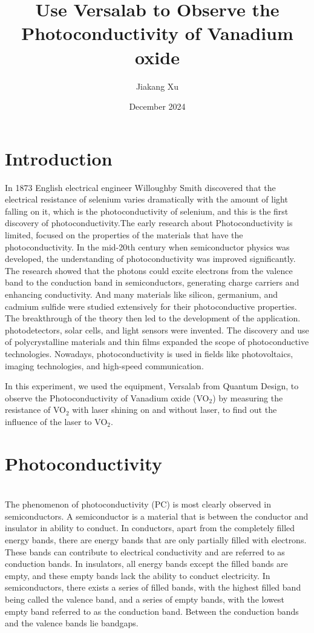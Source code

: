 \documentclass{article}
\title{\vspace{-2.5cm}Use Versalab to Observe the Photoconductivity of Vanadium oxide}
\author{Jiakang Xu}
\date{December 2024}
\begin{document}
\maketitle




\section{Introduction}
In 1873 English electrical engineer Willoughby Smith discovered that the electrical resistance of selenium varies dramatically with the amount of light falling on it, which is the photoconductivity of selenium, and this is the first discovery of photoconductivity\parencite{Smith73}.The early research about Photoconductivity is limited, focused on the properties of the materials that have the photoconductivity. In the mid-20th century when semiconductor physics was developed, the understanding of photoconductivity was improved significantly. 
The research showed that the photons could excite electrons from the valence band to the conduction band in semiconductors, generating charge carriers and enhancing conductivity. And many materials like silicon, germanium, and cadmium sulfide were studied extensively for their photoconductive properties. The breakthrough of the theory then led to the development of the application. photodetectors, solar cells, and light sensors were invented. The discovery and use of polycrystalline materials and thin films expanded the scope of photoconductive technologies. Nowadays, photoconductivity is used in fields like photovoltaics, imaging technologies, and high-speed communication. 

In this experiment, we used the equipment, Versalab from Quantum Design, to observe the Photoconductivity of Vanadium oxide (VO$_{2}$) by measuring the resistance of VO$_{2}$ with laser shining on and without laser, to find out the influence of the laser to VO$_{2}$.
\section{Photoconductivity}


\\The phenomenon of photoconductivity (PC) is most clearly observed in semiconductors\parencite{boer23}. A semiconductor is a material that is between the conductor and insulator in ability to conduct. 
In conductors, apart from the completely filled energy bands, there are energy bands that are only partially filled with electrons. These bands can contribute to electrical conductivity and are referred to as conduction bands. In insulators, all energy bands except the filled bands are empty, and these empty bands lack the ability to conduct electricity. In semiconductors, there exists a series of filled bands, with the highest filled band being called the valence band, and a series of empty bands, with the lowest empty band referred to as the conduction band. Between the conduction bands and the valence bands lie bandgaps\parencite{huang1988}.
\end{document}
